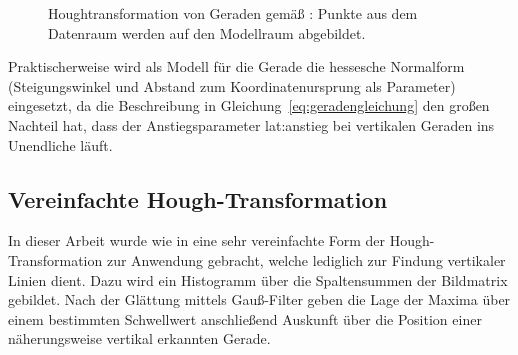 \begin{figure}[htbp] %
  \centering  
  \hfill
  \caption{Houghtransformation von Geraden gemäß \autocite[S.~482]{jaehneDigitaleBildverarbeitungMit2005}: Punkte aus dem Datenraum werden auf den Modellraum abgebildet.}
\end{figure} 

Praktischerweise wird als Modell für die Gerade die hessesche Normalform (Steigungswinkel und Abstand zum Koordinatenursprung als Parameter) eingesetzt, da die Beschreibung in Gleichung~\eqref{eq:geradengleichung} den großen Nachteil hat, dass der Anstiegsparameter \gls{lat:anstieg} bei vertikalen Geraden ins Unendliche läuft. 

\subsection{Vereinfachte Hough-Transformation}
\label{ssec:grundlagen:hough:vereinfachte}
In dieser Arbeit wurde wie in \autocite{alyRealTimeDetection2008} eine sehr vereinfachte Form der Hough-Transformation zur Anwendung gebracht, welche lediglich zur Findung vertikaler Linien dient. Dazu wird ein Histogramm über die Spaltensummen der Bildmatrix gebildet. Nach der Glättung mittels Gauß-Filter geben die Lage der Maxima über einem bestimmten Schwellwert anschließend Auskunft über die Position einer näherungsweise vertikal erkannten Gerade.

